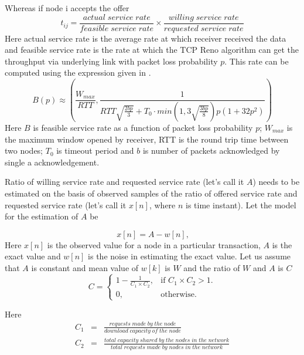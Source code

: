 \documentclass{IEEEtran}
\begin{document}
Whereas if node i accepts the offer
\begin{equation}
t_{ij}=\frac{actual\; service\; rate}{feasible\; service\; rate} \times \frac{willing\; service\; rate}{requested\; service\; rate}
\end{equation}
Here actual service rate is the average rate at which receiver received the data and feasible service rate is the rate at which the TCP Reno algorithm can get the throughput via underlying link with packet loss probability $p$. This rate can be computed using the expression given in \cite{tcpreno}.
\begin{equation}
B(p)\approx \left(\frac{W_{max}}{RTT}, \frac{1}{RTT\sqrt{\frac{2bp}{3}}+T_{0}\cdot min\left(1,3\sqrt{\frac{3bp}{8}}\right) p(1+32p^{2})}\right)
\end{equation}
Here $B$ is feasible service rate as a function of packet loss probability $p$; $W_{max}$ is the maximum window opened by receiver, RTT is the round trip time between two nodes; $T_{0}$ is timeout period and $b$ is number of packets acknowledged by single a acknowledgement.

 Ratio of willing service rate and requested service rate (let's call it $A$) needs to be estimated on the basis of observed samples of the ratio of offered service rate and requested service rate (let's call it $x[n]$, where $n$ is time instant). Let the model for the estimation of $A$ be

\begin{equation}\
\label{model}
  x[n]= A - w[n],
\end{equation}
Here $x[n]$ is the observed value for a node in a particular transaction, $A$ is the exact value and $w[n]$ is the noise in estimating the exact value. Let us assume that $A$ is constant and mean value of $w[k]$ is $W$ and the ratio of $W$ and $A$ is $C$ 
\begin{equation}
C=\begin{cases}
       1-\frac{1}{C_{1}\times C_{2}},& \text{if $C_{1}\times C_{2}$} > 1.\\
			0, & \text{otherwise}.
  \end{cases}
\end{equation}

 Here
\begin{eqnarray}
C_{1}&=&\frac{requests \;made\; by\; the\; node}{download\; capacity \;of
\;the\; node}\\
C_{2}&=&\frac{total\; capacity \;shared\; by \;the\; nodes\; in\; the
\;network}{total\; requests\; made \;by\; nodes\; in\; the\; network}
\end{eqnarray}
\end{document}
